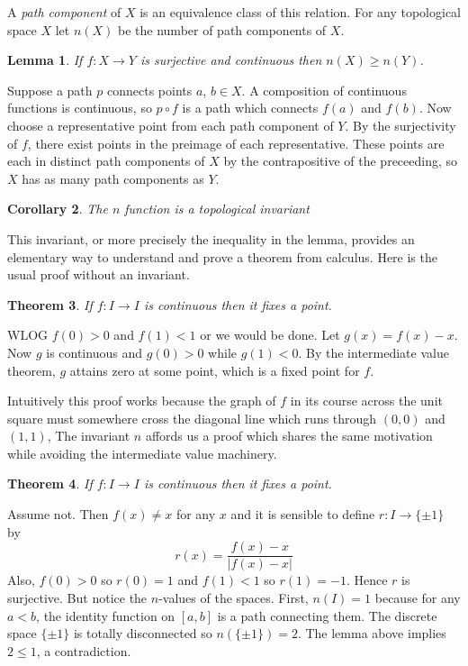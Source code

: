 \documentclass[letterpaper]{article}
\newtheorem{theorem}{Theorem}[section]
\newtheorem{lemma}[theorem]{Lemma}
\newtheorem{corollary}[theorem]{Corollary}
\newenvironment{proof}[1][Proof]{\begin{trivlist}
\item[\hskip \labelsep {\bfseries #1}]}{\end{trivlist}}
\begin{document}
A \emph{path component} of $X$ is an equivalence class of this relation. For any topological space $X$ let $n(X)$ be the number of path components of $X$.

\begin{lemma}
If $f \colon X \rightarrow Y$ is surjective and continuous then $n(X) \geq n(Y)$.
\end{lemma}
\begin{proof}
Suppose a path $p$ connects points $a$, $b \in X$. A composition of continuous functions is continuous, so $p \circ f$ is a path which connects $f(a)$ and $f(b)$. Now choose a representative point from each path component of $Y$. By the surjectivity of $f$, there exist points in the preimage of each representative. These points are each in distinct path components of $X$ by the contrapositive of the preceeding, so $X$ has as many path components as $Y$. 
\end{proof}

\begin{corollary}
The $n$ function is a topological invariant
\end{corollary}

This invariant, or more precisely the inequality in the lemma, provides an elementary way to understand and prove a theorem from calculus. Here is the usual proof without an invariant.

\begin{theorem}
If $f \colon I \rightarrow I$ is continuous then it fixes a point.
\end{theorem}
\begin{proof}
WLOG $f(0) > 0$ and $f(1) < 1$ or we would be done. Let $g(x) = f(x) - x$. Now $g$ is continuous and $g(0) > 0$ while $g(1) < 0$. By the intermediate value theorem, $g$ attains zero at some point, which is a fixed point for $f$.
\end{proof}

Intuitively this proof works because the graph of $f$ in its course across the unit square must somewhere cross the diagonal line which runs through $(0, 0)$ and $(1, 1)$, The invariant $n$ affords us a proof which shares the same motivation while avoiding the intermediate value machinery.

\begin{theorem}
If $f \colon I \rightarrow I$ is continuous then it fixes a point.
\end{theorem}
\begin{proof}
Assume not. Then $f(x) \neq x$ for any $x$ and it is sensible to define $r \colon I \rightarrow \{\pm 1\}$ by \[ r(x) = \frac{f(x) - x}{|f(x) - x|} \] Also, $f(0) > 0$ so $r(0) = 1$ and $f(1) < 1$ so $r(1) = -1$. Hence $r$ is surjective. But notice the $n$-values of the spaces. First, $n(I) = 1$ because for any $a < b$, the identity function on $[a, b]$ is a path connecting them. The discrete space $\{\pm 1\}$ is totally disconnected so $n(\{\pm 1\}) = 2$. The lemma above implies $2 \leq 1$, a contradiction.
\end{proof}
\end{document}
